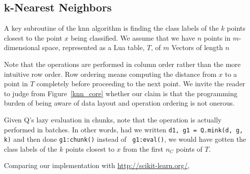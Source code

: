 \subsection{k-Nearest Neighbors}
\label{knn}

A key subroutine of the knn algorithm is finding the class labels of the
\(k\) points closest to the point \(x\) being classified. 
We assume that we have \(n\) points in \(m\)-dimensional space, represented as a
Lua table, \(T\), of \(m\) Vectors of length \(n\)

Note that the operations are performed in column
order rather than the more intuitive row order. Row ordering means computing the
distance from \(x\) to a point in \(T\) completely before proceeding to the next
point. We invite the reader to judge from Figure~\ref{knn_core} whether 
our claim is that the programming burden of being aware of data layout and
operation ordering is not onerous.

Given Q's lazy evaluation in chunks, note that the operation is actually
performed in batches. In other words, had we written 
{\tt d1, g1 = Q.mink(d, g, k)} and then done {\tt g1:chunk()} instead  of {\tt
g1:eval()}, 
we would have gotten the class labels of the \(k\) points
closest to \(x\) from the first \(n_C\) points of \(T\). 


Comparing our implementation with \url{http://scikit-learn.org/}, \TBC

\begin{figure}[hbtp]
\centering
{}
\end{figure}



